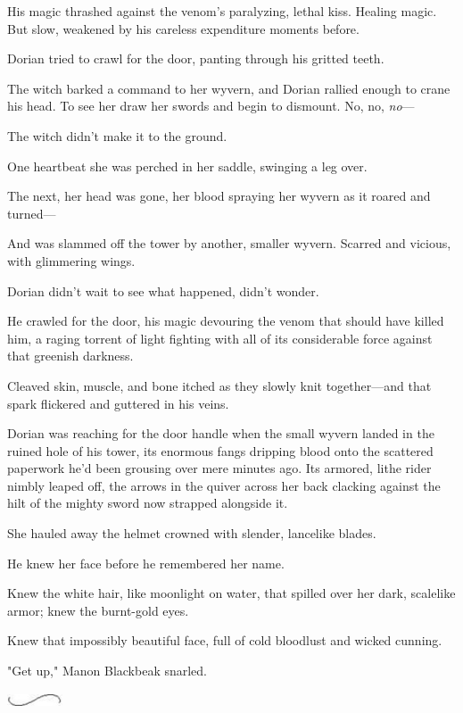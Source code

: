 His magic thrashed against the venom's paralyzing, lethal kiss. Healing magic. But slow, weakened by his careless expenditure moments before.

Dorian tried to crawl for the door, panting through his gritted teeth.

The witch barked a command to her wyvern, and Dorian rallied enough to crane his head. To see her draw her swords and begin to dismount. No, no, \emph{no}---

The witch didn't make it to the ground.

One heartbeat she was perched in her saddle, swinging a leg over.

The next, her head was gone, her blood spraying her wyvern as it roared and turned---

And was slammed off the tower by another, smaller wyvern. Scarred and vicious, with glimmering wings.

Dorian didn't wait to see what happened, didn't wonder.

He crawled for the door, his magic devouring the venom that should have killed him, a raging torrent of light fighting with all of its considerable force against that greenish darkness.

Cleaved skin, muscle, and bone itched as they slowly knit together---and that spark flickered and guttered in his veins.

Dorian was reaching for the door handle when the small wyvern landed in the ruined hole of his tower, its enormous fangs dripping blood onto the scattered paperwork he'd been grousing over mere minutes ago. Its armored, lithe rider nimbly leaped off, the arrows in the quiver across her back clacking against the hilt of the mighty sword now strapped alongside it.

She hauled away the helmet crowned with slender, lancelike blades.

He knew her face before he remembered her name.

Knew the white hair, like moonlight on water, that spilled over her dark, scalelike armor; knew the burnt-gold eyes.

Knew that impossibly beautiful face, full of cold bloodlust and wicked cunning.

"Get up," Manon Blackbeak snarled.

\includegraphics[width=0.65in,height=0.13in]{images/seperator}

